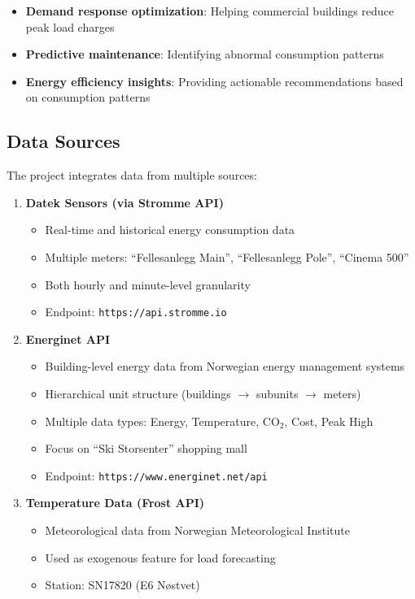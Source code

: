 \documentclass[11pt,a4paper]{article}
\begin{document}
\begin{itemize}
    \item \textbf{Demand response optimization}: Helping commercial buildings reduce peak load charges
    \item \textbf{Predictive maintenance}: Identifying abnormal consumption patterns
    \item \textbf{Energy efficiency insights}: Providing actionable recommendations based on consumption patterns
\end{itemize}

\subsection{Data Sources}

The project integrates data from multiple sources:

\begin{enumerate}
    \item \textbf{Datek Sensors (via Stromme API)}
    \begin{itemize}
        \item Real-time and historical energy consumption data
        \item Multiple meters: ``Fellesanlegg Main'', ``Fellesanlegg Pole'', ``Cinema 500''
        \item Both hourly and minute-level granularity
        \item Endpoint: \texttt{https://api.stromme.io}
    \end{itemize}
    
    \item \textbf{Energinet API}
    \begin{itemize}
        \item Building-level energy data from Norwegian energy management systems
        \item Hierarchical unit structure (buildings $\rightarrow$ subunits $\rightarrow$ meters)
        \item Multiple data types: Energy, Temperature, CO$_2$, Cost, Peak High
        \item Focus on ``Ski Storsenter'' shopping mall
        \item Endpoint: \texttt{https://www.energinet.net/api}
    \end{itemize}
    
    \item \textbf{Temperature Data (Frost API)}
    \begin{itemize}
        \item Meteorological data from Norwegian Meteorological Institute
        \item Used as exogenous feature for load forecasting
        \item Station: SN17820 (E6 Nøstvet)
    \end{itemize}
\end{enumerate}
\end{document}
